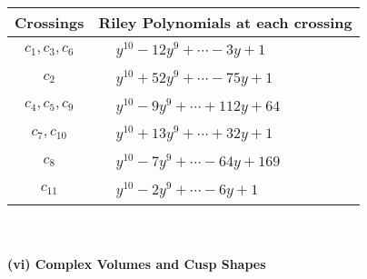 \documentclass[1p]{elsarticle_modified}
\theoremstyle{definition}
\begin{document}
\begin{tabular}{m{50pt}|m{274pt}}
Crossings & \hspace{64pt}Riley Polynomials at each crossing \\
\hline $$\begin{aligned}c_{1},c_{3},c_{6}\end{aligned}$$&$\begin{aligned}
&y^{10}-12 y^9+\cdots-3 y+1
\end{aligned}$\\
\hline $$\begin{aligned}c_{2}\end{aligned}$$&$\begin{aligned}
&y^{10}+52 y^9+\cdots-75 y+1
\end{aligned}$\\
\hline $$\begin{aligned}c_{4},c_{5},c_{9}\end{aligned}$$&$\begin{aligned}
&y^{10}-9 y^9+\cdots+112 y+64
\end{aligned}$\\
\hline $$\begin{aligned}c_{7},c_{10}\end{aligned}$$&$\begin{aligned}
&y^{10}+13 y^9+\cdots+32 y+1
\end{aligned}$\\
\hline $$\begin{aligned}c_{8}\end{aligned}$$&$\begin{aligned}
&y^{10}-7 y^9+\cdots-64 y+169
\end{aligned}$\\
\hline $$\begin{aligned}c_{11}\end{aligned}$$&$\begin{aligned}
&y^{10}-2 y^9+\cdots-6 y+1
\end{aligned}$\\
\hline
\end{tabular}\\~\\
\newpage\flushleft \textbf{(vi) Complex Volumes and Cusp Shapes}
\end{document}
